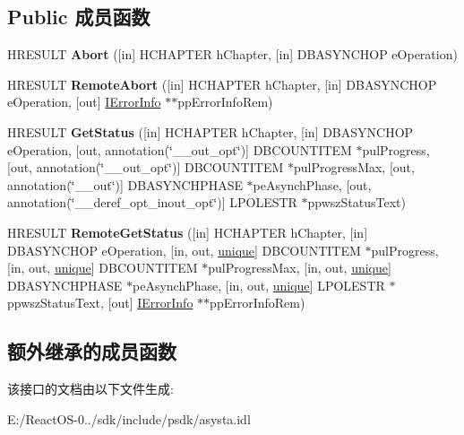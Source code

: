 \subsection*{Public 成员函数}
\begin{DoxyCompactItemize}
\item 
\mbox{\label{interface_i_d_b_asynch_status_a87495d3ddcff83fe5fd7ad5f66421c81}} 
H\+R\+E\+S\+U\+LT {\bfseries Abort} (\mbox{[}in\mbox{]} H\+C\+H\+A\+P\+T\+ER h\+Chapter, \mbox{[}in\mbox{]} D\+B\+A\+S\+Y\+N\+C\+H\+OP e\+Operation)
\item 
\mbox{\label{interface_i_d_b_asynch_status_abf6e27676fe9ece3f36408bef213f0c9}} 
H\+R\+E\+S\+U\+LT {\bfseries Remote\+Abort} (\mbox{[}in\mbox{]} H\+C\+H\+A\+P\+T\+ER h\+Chapter, \mbox{[}in\mbox{]} D\+B\+A\+S\+Y\+N\+C\+H\+OP e\+Operation, \mbox{[}out\mbox{]} \hyperlink{interface_i_error_info}{I\+Error\+Info} $\ast$$\ast$pp\+Error\+Info\+Rem)
\item 
\mbox{\label{interface_i_d_b_asynch_status_aa20785ad6c9127661b66e21a8ad50a2f}} 
H\+R\+E\+S\+U\+LT {\bfseries Get\+Status} (\mbox{[}in\mbox{]} H\+C\+H\+A\+P\+T\+ER h\+Chapter, \mbox{[}in\mbox{]} D\+B\+A\+S\+Y\+N\+C\+H\+OP e\+Operation, \mbox{[}out, annotation(\char`\"{}\+\_\+\+\_\+out\+\_\+opt\char`\"{})\mbox{]} D\+B\+C\+O\+U\+N\+T\+I\+T\+EM $\ast$pul\+Progress, \mbox{[}out, annotation(\char`\"{}\+\_\+\+\_\+out\+\_\+opt\char`\"{})\mbox{]} D\+B\+C\+O\+U\+N\+T\+I\+T\+EM $\ast$pul\+Progress\+Max, \mbox{[}out, annotation(\char`\"{}\+\_\+\+\_\+out\char`\"{})\mbox{]} D\+B\+A\+S\+Y\+N\+C\+H\+P\+H\+A\+SE $\ast$pe\+Asynch\+Phase, \mbox{[}out, annotation(\char`\"{}\+\_\+\+\_\+deref\+\_\+opt\+\_\+inout\+\_\+opt\char`\"{})\mbox{]} L\+P\+O\+L\+E\+S\+TR $\ast$ppwsz\+Status\+Text)
\item 
\mbox{\label{interface_i_d_b_asynch_status_a7a11fde4a8057be78438c5db5b50f43a}} 
H\+R\+E\+S\+U\+LT {\bfseries Remote\+Get\+Status} (\mbox{[}in\mbox{]} H\+C\+H\+A\+P\+T\+ER h\+Chapter, \mbox{[}in\mbox{]} D\+B\+A\+S\+Y\+N\+C\+H\+OP e\+Operation, \mbox{[}in, out, \hyperlink{interfaceunique}{unique}\mbox{]} D\+B\+C\+O\+U\+N\+T\+I\+T\+EM $\ast$pul\+Progress, \mbox{[}in, out, \hyperlink{interfaceunique}{unique}\mbox{]} D\+B\+C\+O\+U\+N\+T\+I\+T\+EM $\ast$pul\+Progress\+Max, \mbox{[}in, out, \hyperlink{interfaceunique}{unique}\mbox{]} D\+B\+A\+S\+Y\+N\+C\+H\+P\+H\+A\+SE $\ast$pe\+Asynch\+Phase, \mbox{[}in, out, \hyperlink{interfaceunique}{unique}\mbox{]} L\+P\+O\+L\+E\+S\+TR $\ast$ppwsz\+Status\+Text, \mbox{[}out\mbox{]} \hyperlink{interface_i_error_info}{I\+Error\+Info} $\ast$$\ast$pp\+Error\+Info\+Rem)
\end{DoxyCompactItemize}
\subsection*{额外继承的成员函数}


该接口的文档由以下文件生成\+:\begin{DoxyCompactItemize}
\item 
E\+:/\+React\+O\+S-\/0../sdk/include/psdk/asysta.\+idl\end{DoxyCompactItemize}
